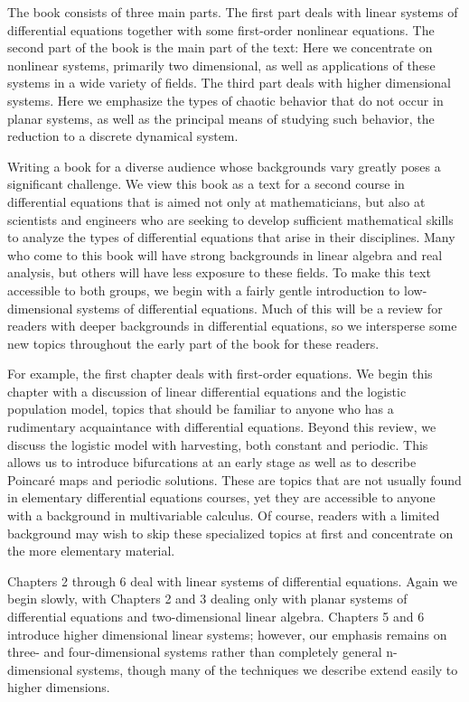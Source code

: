\documentclass[12pt]{article}
\begin{document}
The book consists of three main parts. The first part deals with linear systems
of differential equations together with some first-order nonlinear equations.
The second part of the book is the main part of the text: Here we concentrate on
nonlinear systems, primarily two dimensional, as well as applications of these
systems in a wide variety of fields. The third part deals with higher dimensional
systems. Here we emphasize the types of chaotic behavior that do not occur in
planar systems, as well as the principal means of studying such behavior, the
reduction to a discrete dynamical system.

Writing a book for a diverse audience whose backgrounds vary greatly poses
a significant challenge. We view this book as a text for a second course in
differential equations that is aimed not only at mathematicians, but also at
scientists and engineers who are seeking to develop sufficient mathematical
skills to analyze the types of differential equations that arise in their disciplines.
Many who come to this book will have strong backgrounds in linear algebra
and real analysis, but others will have less exposure to these fields. To make
this text accessible to both groups, we begin with a fairly gentle introduction
to low-dimensional systems of differential equations. Much of this will be a
review for readers with deeper backgrounds in differential equations, so we
intersperse some new topics throughout the early part of the book for these
readers.

For example, the first chapter deals with first-order equations. We begin
this chapter with a discussion of linear differential equations and the logistic
population model, topics that should be familiar to anyone who has a rudimentary
acquaintance with differential equations. Beyond this review, we discuss
the logistic model with harvesting, both constant and periodic. This allows
us to introduce bifurcations at an early stage as well as to describe Poincaré
maps and periodic solutions. These are topics that are not usually found in
elementary differential equations courses, yet they are accessible to anyone
with a background in multivariable calculus. Of course, readers with a limited
background may wish to skip these specialized topics at first and concentrate
on the more elementary material.

Chapters 2 through 6 deal with linear systems of differential equations.
Again we begin slowly, with Chapters 2 and 3 dealing only with planar systems
of differential equations and two-dimensional linear algebra. Chapters
5 and 6 introduce higher dimensional linear systems; however, our emphasis
remains on three- and four-dimensional systems rather than completely
general n-dimensional systems, though many of the techniques we describe
extend easily to higher dimensions.
\end{document}
